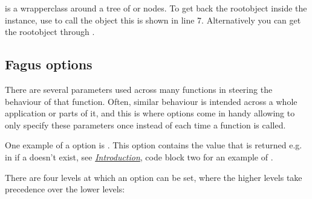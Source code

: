 \documentclass[a4paper,10pt,english]{sphinxmanual}
\begin{document}
\sphinxAtStartPar
{} is a wrapper\sphinxhyphen{}class around a tree of \sphinxhyphen{} or \sphinxhyphen{}nodes. To get back the root\sphinxhyphen{}object inside the instance, use \sphinxcode{\sphinxupquote{()}} to call the object \textendash{} this is shown in line 7. Alternatively you can get the root\sphinxhyphen{}object through .


\subsection{Fagus options}
\label{\detokenize{README:fagus-options}}
\sphinxAtStartPar
There are several parameters used across many functions in  steering the behaviour of that function. Often, similar behaviour is intended across a whole application or parts of it, and this is where options come in handy allowing to only specify these parameters once instead of each time a function is called.

\sphinxAtStartPar
One example of a \sphinxhyphen{}option is {\hyperref[\detokenize{README:default}]{\emph{}}}. This option contains the value that is returned e.g. in {\hyperref[\detokenize{README:the-path-parameter}]{\emph{}}} if a {\hyperref[\detokenize{README:the-path-parameter}]{\emph{}}} doesn’t exist, see {\hyperref[\detokenize{README:introduction----what-it-solves}]{\emph{Introduction}}}, code block two for an example of {\hyperref[\detokenize{README:default}]{\emph{}}}.

\sphinxAtStartPar
There are four levels at which an option can be set, where the higher levels take precedence over the lower levels:
\end{document}
